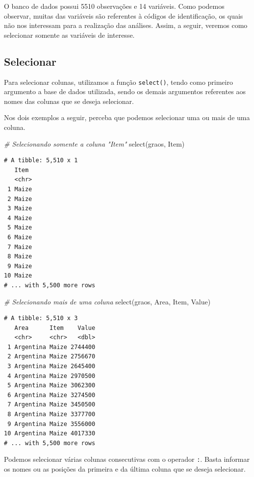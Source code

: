 \documentclass[
  brazilian,
]{book}
\newenvironment{Shaded}{\begin{snugshade}}{\end{snugshade}}
\newcommand{\CommentTok}[1]{\textcolor[rgb]{0.56,0.35,0.01}{\textit{#1}}}
\newcommand{\FunctionTok}[1]{\textcolor[rgb]{0.00,0.00,0.00}{#1}}
\newcommand{\NormalTok}[1]{#1}
\begin{document}
O banco de dados possui 5510 observações e 14 variáveis. Como podemos observar, muitas das variáveis são referentes à códigos de identificação, os quais não nos interessam para a realização das análises. Assim, a seguir, veremos como selecionar somente as variáveis de interesse.

\hypertarget{selecionar}{%
\subsection{Selecionar}\label{selecionar}}

Para selecionar colunas, utilizamos a função \texttt{select()}, tendo como primeiro argumento a base de dados utilizada, sendo os demais argumentos referentes aos nomes das colunas que se deseja selecionar.

Nos dois exemplos a seguir, perceba que podemos selecionar uma ou mais de uma coluna.

\begin{Shaded}
\begin{Highlighting}[]
\CommentTok{\# Selecionando somente a coluna "Item"}
\FunctionTok{select}\NormalTok{(graos,}
\NormalTok{       Item)}
\end{Highlighting}
\end{Shaded}

\begin{verbatim}
# A tibble: 5,510 x 1
   Item 
   <chr>
 1 Maize
 2 Maize
 3 Maize
 4 Maize
 5 Maize
 6 Maize
 7 Maize
 8 Maize
 9 Maize
10 Maize
# ... with 5,500 more rows
\end{verbatim}

\begin{Shaded}
\begin{Highlighting}[]
\CommentTok{\# Selecionando mais de uma coluna}
\FunctionTok{select}\NormalTok{(graos,}
\NormalTok{       Area, Item, Value)}
\end{Highlighting}
\end{Shaded}

\begin{verbatim}
# A tibble: 5,510 x 3
   Area      Item    Value
   <chr>     <chr>   <dbl>
 1 Argentina Maize 2744400
 2 Argentina Maize 2756670
 3 Argentina Maize 2645400
 4 Argentina Maize 2970500
 5 Argentina Maize 3062300
 6 Argentina Maize 3274500
 7 Argentina Maize 3450500
 8 Argentina Maize 3377700
 9 Argentina Maize 3556000
10 Argentina Maize 4017330
# ... with 5,500 more rows
\end{verbatim}

Podemos selecionar várias colunas consecutivas com o operador \texttt{:}. Basta informar os nomes ou as posições da primeira e da última coluna que se deseja selecionar.
\end{document}

